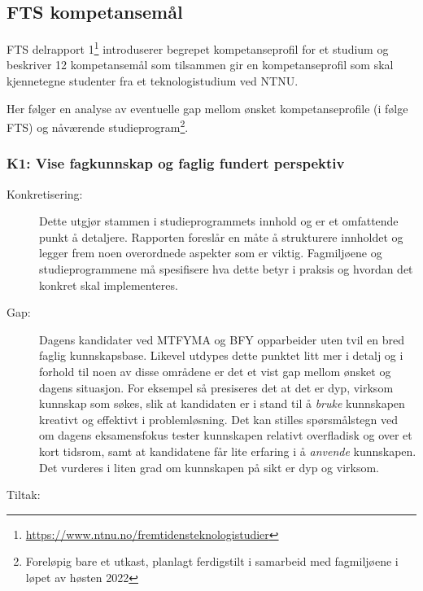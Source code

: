 \subsection{FTS kompetansemål}
\label{sec:fts-competencies}
FTS delrapport 1\footnote{\url{https://www.ntnu.no/fremtidensteknologistudier}} introduserer begrepet kompetanseprofil for et studium og beskriver 12 kompetansemål som tilsammen gir en kompetanseprofil som skal kjennetegne studenter fra et teknologistudium ved NTNU.

Her følger en analyse av eventuelle gap mellom ønsket kompetanseprofile (i følge FTS) og nåværende studieprogram\footnote{Foreløpig bare et utkast, planlagt ferdigstilt i samarbeid med fagmiljøene i løpet av høsten 2022}.

\subsubsection{K1: Vise fagkunnskap og faglig fundert perspektiv}
\begin{description}
\item[Konkretisering:] Dette utgjør stammen i studieprogrammets innhold og er et omfattende punkt å detaljere. Rapporten foreslår en måte å strukturere innholdet og legger frem noen overordnede aspekter som er viktig. Fagmiljøene og studieprogrammene må spesifisere hva dette betyr i praksis og hvordan det konkret skal implementeres.
\item[Gap:] Dagens kandidater ved MTFYMA og BFY opparbeider uten tvil en bred faglig kunnskapsbase. Likevel utdypes dette punktet litt mer i detalj og i forhold til noen av disse områdene er det et vist gap mellom ønsket og dagens situasjon. For eksempel så presiseres det at det er dyp, virksom kunnskap som søkes, slik at kandidaten er i stand til å \emph{bruke} kunnskapen kreativt og effektivt i problemløsning. Det kan stilles spørsmålstegn ved om dagens eksamensfokus tester kunnskapen relativt overfladisk og over et kort tidsrom, samt at kandidatene får lite erfaring i å \emph{anvende} kunnskapen. Det vurderes i liten grad om kunnskapen på sikt er dyp og virksom.
\item[Tiltak:] 
\end{description}


